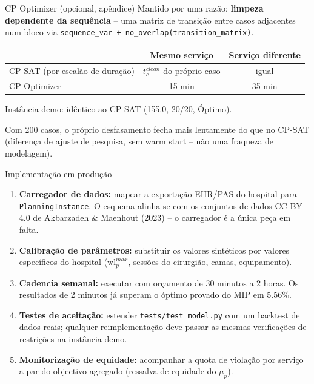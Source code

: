 \documentclass[10pt,aspectratio=169]{beamer}
\newcommand{\bk}{\hfill\hyperlink{toc}{\beamerreturnbutton{Agenda}}}
\begin{document}
\begin{frame}{CP Optimizer (opcional, ap\^endice)}
  \small Mantido por uma raz\~ao: \textbf{limpeza dependente da
  sequ\^encia} -- uma matriz de transi\c{c}\~ao entre casos adjacentes
  num bloco via \texttt{sequence\_var + no\_overlap(transition\_matrix)}.
  \begin{center}\small
  \begin{tabular}{lcc}
    \toprule
    & Mesmo servi\c{c}o & Servi\c{c}o diferente \\
    \midrule
    CP-SAT (por escal\~ao de dura\c{c}\~ao) & $t_c^{clean}$ do pr\'oprio caso & igual \\
    CP Optimizer & 15 min & 35 min \\
    \bottomrule
  \end{tabular}
  \end{center}
  Inst\^ancia demo: id\^entico ao CP-SAT (155.0, 20/20, \'Optimo).

  Com 200 casos, o pr\'oprio desfasamento fecha mais lentamente do que
  no CP-SAT (diferen\c{c}a de ajuste de pesquisa, sem warm start --
  n\~ao uma fraqueza de modelagem).
  \bk
\end{frame}

\begin{frame}{Implementa\c{c}\~ao em produ\c{c}\~ao}
  \begin{enumerate}\small
    \item \textbf{Carregador de dados:} mapear a exporta\c{c}\~ao
      EHR/PAS do hospital para \texttt{PlanningInstance}. O esquema
      alinha-se com os conjuntos de dados CC BY 4.0 de Akbarzadeh \&
      Maenhout (2023) -- o carregador \'e a \'unica pe\c{c}a em falta.
    \item \textbf{Calibra\c{c}\~ao de par\^ametros:} substituir os
      valores sint\'eticos por valores espec\'ificos do hospital
      ($\text{wl}^{max}_p$, sess\~oes do cirurgi\~ao, camas, equipamento).
    \item \textbf{Cadenc\'ia semanal:} executar com or\c{c}amento de
      30 minutos a 2 horas. Os resultados de 2 minutos j\'a superam
      o \'optimo provado do MIP em 5.56\%.
    \item \textbf{Testes de aceita\c{c}\~ao:} estender
      \texttt{tests/test\_model.py} com um backtest de dados reais;
      qualquer reimplementa\c{c}\~ao deve passar as mesmas verifica\c{c}\~oes
      de restri\c{c}\~oes na inst\^ancia demo.
    \item \textbf{Monitoriza\c{c}\~ao de equidade:} acompanhar a quota
      de viola\c{c}\~ao por servi\c{c}o a par do objectivo agregado
      (ressalva de equidade do $\mu_p$).
  \end{enumerate}
  \bk
\end{frame}
\end{document}
